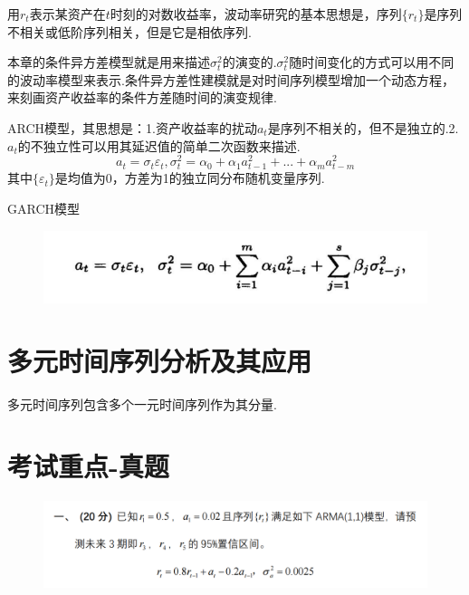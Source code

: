 \documentclass[UTF8]{ctexart}
\begin{document}
用$r_t$表示某资产在$t$时刻的对数收益率，波动率研究的基本思想是，序列$\{r_t\}$是序列不相关或低阶序列相关，但是它是相依序列.

\hspace*{\fill}

本章的条件异方差模型就是用来描述$\sigma_t^2$的演变的.$\sigma_t^2$随时间变化的方式可以用不同的波动率模型来表示.条件异方差性建模就是对时间序列模型增加一个动态方程，来刻画资产收益率的条件方差随时间的演变规律.

\hspace*{\fill}

ARCH模型，其思想是：1.资产收益率的扰动$a_t$是序列不相关的，但不是独立的.2.$a_t$的不独立性可以用其延迟值的简单二次函数来描述.\[a_t=\sigma_t \varepsilon_t,\sigma_t^2=\alpha_0+\alpha_1 a_{t-1}^2+...+\alpha_m a_{t-m}^2\]其中$\{\varepsilon_t\}$是均值为0，方差为1的独立同分布随机变量序列.

\hspace*{\fill}

GARCH模型

     \begin{figure}[h]
         \centering
         \includegraphics[scale=0.45]{images9.png}
     \end{figure}





\section{多元时间序列分析及其应用}


多元时间序列包含多个一元时间序列作为其分量.







\section{考试重点-真题}

     \begin{figure}[h]
         \centering
         \includegraphics[scale=0.35]{images1.png}
     \end{figure}
\end{document}
